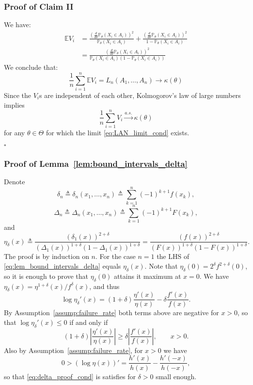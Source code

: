 \documentclass[letterpaper, 11pt]{IEEEtran}      %
\newcommand{\Prob}{\mathbb{P} }
\newcommand*{\QEDA}{\hfill\ensuremath{\square}}
\begin{document}
\subsubsection*{Proof of Claim II} 
We have:
\begin{align*}
\mathbb E V_i  & = 
 \frac{ \left(\frac{d}{d\theta} \Prob_{\theta}(X_i \in A_i) \right)^2}{\Prob_{\theta}(X_i \in A_i)}  
+ 
 \frac{ \left(\frac{d}{d\theta} \Prob_{\theta}(X_i \in A_i) \right)^2}{1-\Prob_{\theta}(X_i \in A_i)}  \\
 & = 
  \frac{ \left(\frac{d}{d\theta} \Prob_{\theta}(X_i \in A_i) \right)^2}{\Prob_{\theta}(X_i \in A_i) \left( 1-\Prob_{\theta}(X_i \in A_i) \right)}  
\end{align*}
 We conclude that:
\begin{equation} \label{eq:LAN_limit_cond}
\frac{1}{n} \sum_{i=1}^n \mathbb E V_i =   L_n(A_1,\ldots,A_n)  \to \kappa(\theta)
\end{equation}
Since the $V_i$s are independent of each other, Kolmogorov's law of large numbers implies
\[
\frac{1}{n} \sum_{i=1}^n  V_i \overset{a.s.}{\longrightarrow} \kappa(\theta)
\]
for any $\theta \in \Theta$ for which the limit \eqref{eq:LAN_limit_cond} exists.

\QEDA


\subsubsection*{Proof of Lemma~\ref{lem:bound_intervals_delta}} 
Denote 
\[
\delta_n \triangleq \delta_n(x_1,\ldots,x_n) \triangleq \sum_{k=1}^{n} (-1)^{k+1} f(x_k),
\]
\[
\Delta_n \triangleq \Delta_n(x_1,\ldots,x_n) \triangleq  \sum_{k=1}^n (-1)^{k+1} F(x_k),
\]
and 
\[
\eta_\delta(x) \triangleq  \frac{  \left(\delta_1(x) \right)^{2+\delta}}{  \left(\Delta_1(x)  \right)^{1+\delta}
(1-\Delta_1(x))^{1+\delta}}
= \frac{  \left( f (x) \right)^{2+\delta}}{ \left(F(x) \right)^{1+\delta}(1-F(x))^{1+\delta}}. 
\]
The proof is by induction on $n$. For the case $n=1$ the LHS of \eqref{eq:lem_bound_intervals_delta} equals $\eta_\delta(x)$. Note that $\eta_\delta(0) = 2^\delta f^{2+\delta}(0)$, so it is enough to prove that $\eta_\delta(0)$ attains it maximum at $x=0$. We have $\eta_\delta(x) = \eta^{1+\delta}(x)/f^\delta(x)$, and thus
\[
\log \eta_\delta'(x) = (1+\delta) \frac{\eta'(x)}{\eta(x)} - \delta \frac{f'(x)}{f(x)}. 
\]
By Assumption~\ref{assump:failure_rate} both terms above are negative for $x>0$, so that $\log \eta_\delta'(x) \leq 0$ if and only if
\begin{equation} \label{eq:delta_proof_cond}
(1+\delta) \left| \frac{\eta'(x)}{\eta(x)} \right| \geq \delta \left| \frac{f'(x)}{f(x)} \right|, \qquad x>0.
\end{equation}
Also by Assumption~\ref{assump:failure_rate}, for $x>0$ we have
\[
0 > (\log \eta(x))' = \frac{h'(x)}{h(x)}-\frac{h'(-x)}{h(-x)},
\]
so that \eqref{eq:delta_proof_cond} is satisfies for $\delta>0$ small enough. 
\end{document}
